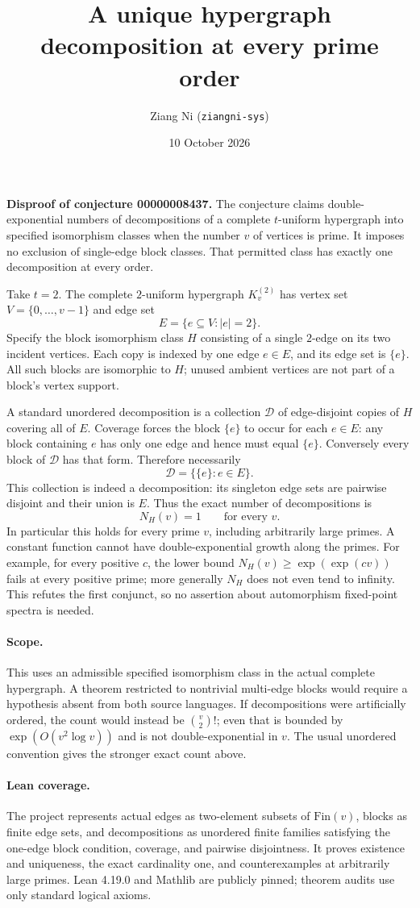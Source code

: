 \documentclass[11pt]{article}
\title{A unique hypergraph decomposition at every prime order}
\author{Ziang Ni (\texttt{ziangni-sys})}
\date{10 October 2026}
\begin{document}
\maketitle
\noindent\textbf{Disproof of conjecture 00000008437.}
The conjecture claims double-exponential numbers of decompositions
of a complete $t$-uniform hypergraph into specified isomorphism
classes when the number $v$ of vertices is prime. It imposes no
exclusion of single-edge block classes. That permitted class has
exactly one decomposition at every order.

Take $t=2$. The complete $2$-uniform hypergraph $K_v^{(2)}$ has vertex
set $V=\{0,\ldots,v-1\}$ and edge set
\[
 E=\{e\subseteq V:|e|=2\}.
\]
Specify the block isomorphism class $H$ consisting of a single
$2$-edge on its two incident vertices. Each copy is indexed by one
edge $e\in E$, and its edge set is $\{e\}$. All such blocks are
isomorphic to $H$; unused ambient vertices are not part of a block's
vertex support.

A standard unordered decomposition is a collection $\mathcal D$ of
edge-disjoint copies of $H$ covering all of $E$. Coverage forces the
block $\{e\}$ to occur for each $e\in E$: any block containing $e$
has only one edge and hence must equal $\{e\}$. Conversely every block
of $\mathcal D$ has that form. Therefore necessarily
\[
 \mathcal D=\big\{\{e\}:e\in E\big\}.
\]
This collection is indeed a decomposition: its singleton edge sets
are pairwise disjoint and their union is $E$. Thus the exact number
of decompositions is
\[
 N_H(v)=1\qquad\text{for every }v.
\]
In particular this holds for every prime $v$, including arbitrarily
large primes. A constant function cannot have double-exponential
growth along the primes. For example, for every positive $c$, the
lower bound $N_H(v)\geq\exp(\exp(cv))$ fails at every positive prime;
more generally $N_H$ does not even tend to infinity. This refutes the
first conjunct, so no assertion about automorphism fixed-point
spectra is needed.

\paragraph{Scope.}
This uses an admissible specified isomorphism class in the actual
complete hypergraph. A theorem restricted to nontrivial multi-edge
blocks would require a hypothesis absent from both source languages.
If decompositions were artificially ordered, the count would instead
be $\binom v2!$; even that is bounded by
$\exp(O(v^2\log v))$ and is not double-exponential in $v$. The usual
unordered convention gives the stronger exact count above.

\paragraph{Lean coverage.}
The project represents actual edges as two-element subsets of
$\mathrm{Fin}(v)$, blocks as finite edge sets, and decompositions as
unordered finite families satisfying the one-edge block condition,
coverage, and pairwise disjointness. It proves existence and uniqueness,
the exact cardinality one, and counterexamples at arbitrarily large
primes. Lean 4.19.0 and Mathlib are publicly pinned; theorem audits
use only standard logical axioms.
\end{document}
